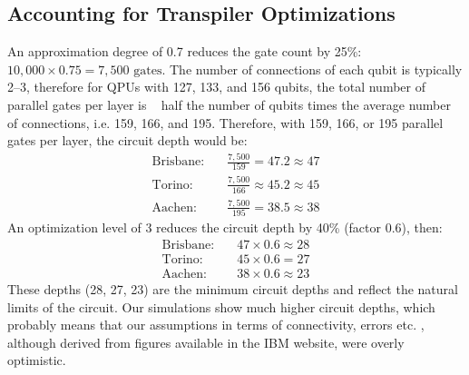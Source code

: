 \documentclass[conference,twoside]{IEEEtran}
\begin{document}
\subsection{Accounting for Transpiler Optimizations}
An approximation degree of 0.7 reduces the gate count by 25\%: \(10,000 \times 0.75 = 7,500 \text{ gates}\). The number of connections of each qubit is typically 2–3, therefore for QPUs with 127, 133, and 156 qubits, the total number of parallel gates per layer is ~ half the number of qubits times the average number of connections, i.e. 159, 166, and 195. Therefore, with 159, 166, or 195 parallel gates per layer, the circuit depth would be:
\begin{align*}
\text{Brisbane:} \quad & \frac{7,500}{159} = 47.2  \approx  47 \\
\text{Torino:} \quad & \frac{7,500}{166}  \approx  45.2 \approx  45 \\
\text{Aachen:} \quad & \frac{7,500}{195} = 38.5 \approx  38
\end{align*}
An optimization level of 3 reduces the circuit depth by 40\% (factor 0.6), then:
\begin{align*}
\text{Brisbane:} \quad & 47 \times 0.6 \approx 28\\
\text{Torino:} \quad & 45 \times 0.6 = 27 \\
\text{Aachen:} \quad & 38 \times 0.6 \approx 23
\end{align*}
These depths (28, 27, 23) are the minimum circuit depths and reflect the natural limits of the circuit. Our simulations show much higher circuit depths, which probably means that our assumptions in terms of connectivity, errors etc. , although derived from figures available in the IBM website, were overly optimistic.
\end{document}
